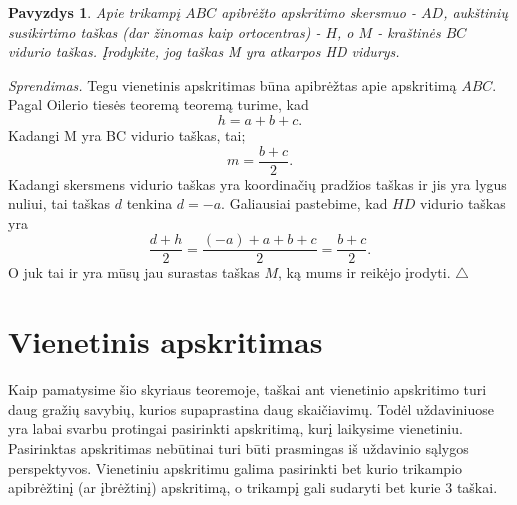 \documentclass[11pt,a4paper,twoside]{book}
\newenvironment{sprendimas}{\noindent \textit{Sprendimas.}}{\hfill $\triangle$}
\newcounter{foo}[subsection]
\newtheorem{pavnr}[foo]{Pavyzdys}
\theoremstyle{definition} \newtheorem*{api}{Apibrėžimas}
\theoremstyle{remark} \newtheorem*{pastaba}{Pastaba}
\begin{document}
\begin{pavnr}

Apie trikampį $ABC$ apibrėžto apskritimo skersmuo - $AD$, aukštinių susikirtimo
taškas (dar žinomas kaip ortocentras) - $H$, o $M$ - kraštinės $BC$ vidurio taškas. Įrodykite, jog taškas M yra atkarpos HD vidurys.
\end{pavnr}
\begin{sprendimas}
Tegu vienetinis apskritimas būna apibrėžtas apie apskritimą $ABC$. Pagal Oilerio tiesės teoremą teoremą turime, kad $$ h = a+b+c.$$ Kadangi M yra BC vidurio taškas, tai; $$m= \frac{b+c}{2}.$$ Kadangi skersmens vidurio taškas yra koordinačių pradžios taškas ir jis yra lygus nuliui, tai taškas $d$  tenkina $d= -a.$ Galiausiai pastebime, kad $HD$ vidurio taškas yra $$ \frac{d+h}{2} = \frac {(-a)+a+b+c}{2}= \frac{b+c}{2}.$$ O juk tai ir yra mūsų jau surastas taškas $M$, ką mums ir reikėjo įrodyti.
\end{sprendimas}
















\chapter{Vienetinis apskritimas}

Kaip pamatysime šio skyriaus teoremoje, taškai ant vienetinio apskritimo turi daug gražių savybių, kurios supaprastina daug skaičiavimų. Todėl uždaviniuose yra labai svarbu protingai pasirinkti apskritimą, kurį laikysime vienetiniu. Pasirinktas apskritimas nebūtinai turi būti prasmingas iš uždavinio sąlygos perspektyvos. Vienetiniu apskritimu galima pasirinkti bet kurio trikampio apibrėžtinį (ar įbrėžtinį) apskritimą, o trikampį gali sudaryti bet kurie 3 taškai.
\end{document}
